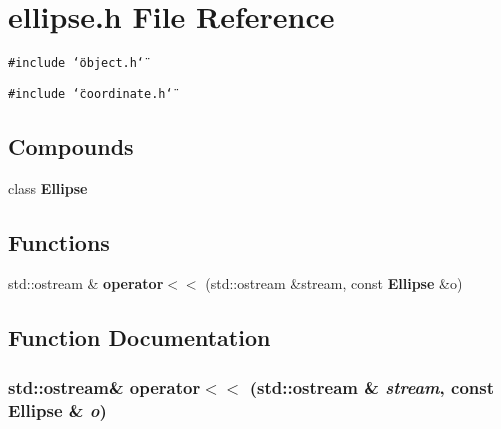 \section{ellipse.h File Reference}
\label{ellipse_8h}
{\tt \#include \char`\"{}object.h\char`\"{}}\par
{\tt \#include \char`\"{}coordinate.h\char`\"{}}\par
\subsection*{Compounds}
\begin{CompactItemize}
\item 
class {\bf Ellipse}
\end{CompactItemize}
\subsection*{Functions}
\begin{CompactItemize}
\item 
std::ostream \& {\bf operator$<$$<$} (std::ostream \&stream, const {\bf Ellipse} \&o)
\end{CompactItemize}


\subsection{Function Documentation}
\subsubsection{\setlength{\rightskip}{0pt plus 5cm}std::ostream\& operator$<$$<$ (std::ostream \& {\em stream}, const {\bf Ellipse} \& {\em o})\hspace{0.3cm}{\tt  [inline]}}\label{ellipse_8h_a0}


